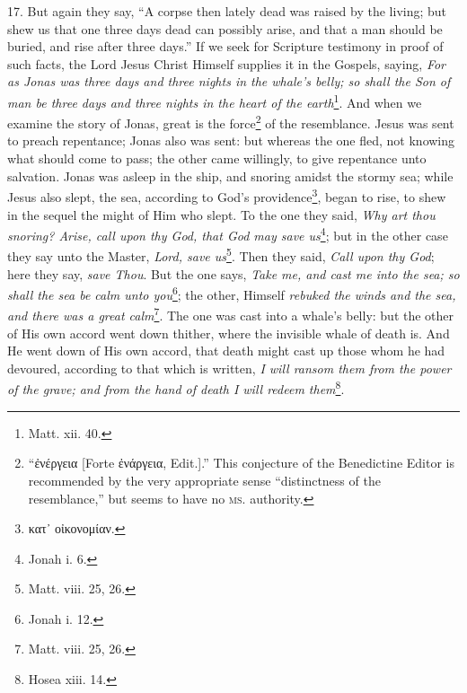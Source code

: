 17. But again they say, “A corpse then lately dead was raised by the living; but shew us that one three days dead can possibly arise, and that a man should be buried, and rise after three days.” If we seek for Scripture testimony in proof of such facts, the Lord Jesus Christ Himself supplies it in the Gospels, saying, \emph{For as Jonas was three days and three nights in the whale’s belly; so shall the Son of man be three days and three nights in the heart of the earth}\footnote{Matt. xii. 40.}. And when we examine the story of Jonas, great is the force\footnote{\textgreek{“ἐνέργεια} [Forte \textgreek{ἐνάργεια}, Edit.].” This conjecture of the Benedictine Editor is recommended by the very appropriate sense “distinctness of the resemblance,” but seems to have no \textsc{ms.} authority.} of the resemblance. Jesus was sent to preach repentance; Jonas also was sent: but whereas the one fled, not knowing what should come to pass; the other came willingly, to give repentance unto salvation. Jonas was asleep in the ship, and snoring amidst the stormy sea; while Jesus also slept, the sea, according to God’s providence\footnote{\textgreek{κατ᾽ οἰκονομίαν}.}, began to rise, to shew in the sequel the might of Him who slept. To the one they said, \emph{Why art thou snoring? Arise, call upon thy God, that God may save us}\footnote{Jonah i. 6.}; but in the other case they say unto the Master, \emph{Lord, save us}\footnote{Matt. viii. 25, 26.}. Then they said, \emph{Call upon thy God}; here they say, \emph{save Thou}. But the one says, \emph{Take me, and cast me into the sea; so shall the sea be calm unto you}\footnote{Jonah i. 12.}; the other, Himself \emph{rebuked the winds and the sea, and there was a great calm}\footnote{Matt. viii. 25, 26.}. The one was cast into a whale’s belly: but the other of His own accord went down thither, where the invisible whale of death is. And He went down of His own accord, that death might cast up those whom he had devoured, according to that which is written, \emph{I will ransom them from the power of the grave; and from the hand of death I will redeem them}\footnote{Hosea xiii. 14.}.

